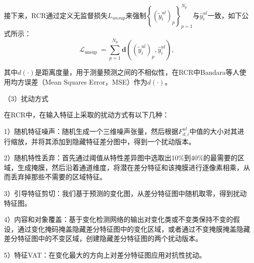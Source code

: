 \documentclass[lang=chs, degree=master, blindreview=false, adobe=false]{yanputhesis}
\begin{document}
接下来，RCR通过定义无监督损失$L_{unsup}$来强制$\left\{\left(\widetilde{y}_{i}^{u l}\right)_{p}\right\}_{p=1}^{N_{p}}$与$\hat{y}_{i}^{u l}$一致，如下公式所示：
\begin{equation}
  \label{eq:RCRLossu}
  \mathcal{L}_{\text {unsup }}=\sum_{p=1}^{N_{p}} \mathbf{d}\left(\left(\widetilde{y}_{i}^{u l}\right)_{p}, \hat{y}_{i}^{u l}\right),
\end{equation}

其中$d(\cdot)$是距离度量，用于测量预测之间的不相似性，在RCR中Bandara等人使用均方误差（Mean Squares Error，MSE）作为$d(\cdot)$。

（3）扰动方式

在RCR中，在输入特征上采取的扰动方式有以下几种：

1）随机特征噪声：随机生成一个三维噪声张量，然后根据$F_{d, i}^{u l}$中值的大小对其进行缩放，并将其添加到隐藏特征差分图中，得到一个扰动版本。

2）随机特性丢弃：首先通过阈值从特性差异图中选取出10$\%$到40$\%$的最需要的区域，生成掩膜，然后沿着通道维度，将潜在差分特征和该掩膜进行逐像素相乘，从而丢弃掉那些不需要的区域特征。

3）引导特征剪切：我们基于预测的变化图，从差分特征图中随机取零，得到扰动特征图。

4）内容和对象覆盖：基于变化检测网络的输出对变化类或不变类保持不变的假设，通过变化掩码掩盖隐藏差分特征图中的变化区域，或者通过不变掩膜掩盖隐藏差分特征图中的不变区域，创建隐藏差分特征图的两个扰动版本。

5）特征VAT\cite{2019VAT}：在变化最大的方向上对差分特征图应用对抗性扰动。
\end{document}
